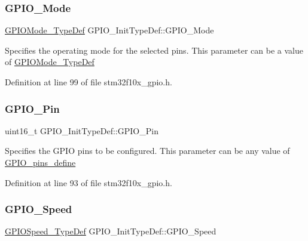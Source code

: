 \subsubsection{\texorpdfstring{G\+P\+I\+O\+\_\+\+Mode}{GPIO\_Mode}}
{\footnotesize\ttfamily \hyperlink{group___g_p_i_o___exported___types_ga1347339e1c84a196fabbb31205eec5d4}{G\+P\+I\+O\+Mode\+\_\+\+Type\+Def} G\+P\+I\+O\+\_\+\+Init\+Type\+Def\+::\+G\+P\+I\+O\+\_\+\+Mode}

Specifies the operating mode for the selected pins. This parameter can be a value of \hyperlink{group___g_p_i_o___exported___types_ga1347339e1c84a196fabbb31205eec5d4}{G\+P\+I\+O\+Mode\+\_\+\+Type\+Def} 

Definition at line 99 of file stm32f10x\+\_\+gpio.\+h.

\mbox{\label{struct_g_p_i_o___init_type_def_a35fc26fc58226126c5b99478a472e5e9}} 
\subsubsection{\texorpdfstring{G\+P\+I\+O\+\_\+\+Pin}{GPIO\_Pin}}
{\footnotesize\ttfamily uint16\+\_\+t G\+P\+I\+O\+\_\+\+Init\+Type\+Def\+::\+G\+P\+I\+O\+\_\+\+Pin}

Specifies the G\+P\+IO pins to be configured. This parameter can be any value of \hyperlink{group___g_p_i_o__pins__define}{G\+P\+I\+O\+\_\+pins\+\_\+define} 

Definition at line 93 of file stm32f10x\+\_\+gpio.\+h.

\mbox{\label{struct_g_p_i_o___init_type_def_ac05832cacebc861a9acf5294d702c16b}} 
\subsubsection{\texorpdfstring{G\+P\+I\+O\+\_\+\+Speed}{GPIO\_Speed}}
{\footnotesize\ttfamily \hyperlink{group___g_p_i_o___exported___types_ga062ad92b67b4a1f301c161022cf3ba8e}{G\+P\+I\+O\+Speed\+\_\+\+Type\+Def} G\+P\+I\+O\+\_\+\+Init\+Type\+Def\+::\+G\+P\+I\+O\+\_\+\+Speed}

